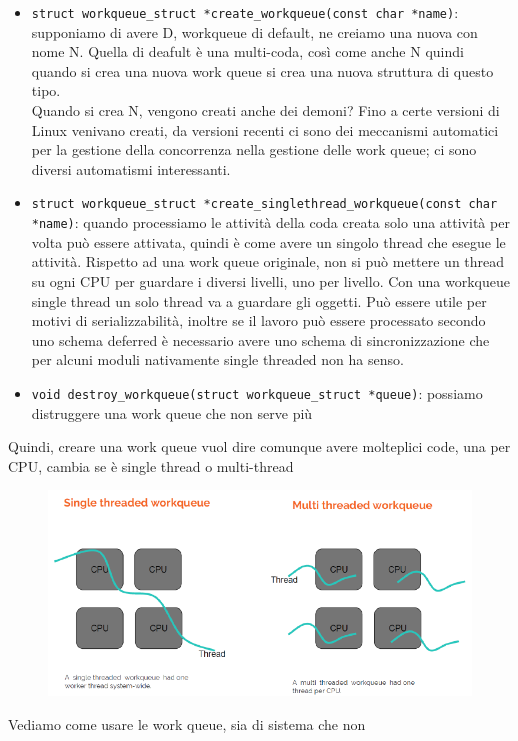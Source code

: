 \documentclass[12pt, oneside]{extbook}
\begin{document}
\begin{itemize}
\item \texttt{struct workqueue\_struct *create\_workqueue(const char *name)}: supponiamo di avere D, workqueue di default, ne creiamo una nuova con nome N. Quella di deafult è una multi-coda, così come anche N quindi quando si crea una nuova work queue si crea una nuova struttura di questo tipo.\\Quando si crea N, vengono creati anche dei demoni? Fino a certe versioni di Linux venivano creati, da versioni recenti ci sono dei meccanismi automatici per la gestione della concorrenza nella gestione delle work queue; ci sono diversi automatismi interessanti.
\item \texttt{struct workqueue\_struct *create\_singlethread\_workqueue(const char *name)}: quando processiamo le attività della coda creata solo una attività per volta può essere attivata, quindi è come avere un singolo thread che esegue le attività. Rispetto ad una work queue originale, non si può mettere un thread su ogni CPU per guardare i diversi livelli, uno per livello. Con una workqueue single thread un solo thread va a guardare gli oggetti. Può essere utile per motivi di serializzabilità, inoltre se il lavoro può essere processato secondo uno schema deferred è necessario avere uno schema di sincronizzazione che per alcuni moduli nativamente single threaded non ha senso.
\item \texttt{void destroy\_workqueue(struct workqueue\_struct *queue)}: possiamo distruggere una work queue che non serve più
\end{itemize}
Quindi, creare una work queue vuol dire comunque avere molteplici code, una per CPU, cambia se è single thread o multi-thread
\begin{figure}
	\includegraphics[scale=0.4]{immagini/wq_on_cpu.png}
\end{figure}
Vediamo come usare le work queue, sia di sistema che non
\end{document}
